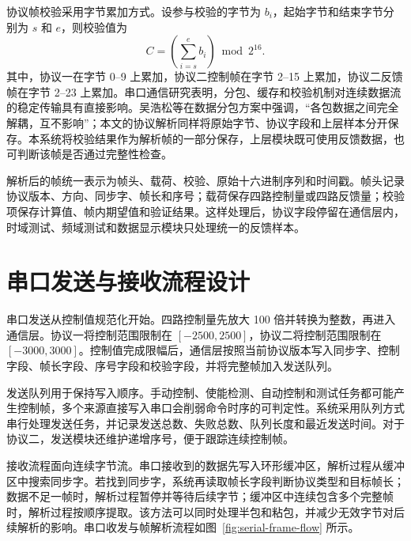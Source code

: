 协议帧校验采用字节累加方式。设参与校验的字节为 $b_i$，起始字节和结束字节分别为 $s$ 和 $e$，则校验值为
\begin{equation}
  C=\left(\sum_{i=s}^{e} b_i\right)\bmod 2^{16}.
\end{equation}
其中，协议一在字节 0--9 上累加，协议二控制帧在字节 2--15 上累加，协议二反馈帧在字节 2--23 上累加。串口通信研究表明，分包、缓存和校验机制对连续数据流的稳定传输具有直接影响。吴浩松等在数据分包方案中强调，``各包数据之间完全解耦，互不影响''\cite{wu2025serialpacket}；本文的协议解析同样将原始字节、协议字段和上层样本分开保存。本系统将校验结果作为解析帧的一部分保存，上层模块既可使用反馈数据，也可判断该帧是否通过完整性检查。

解析后的帧统一表示为帧头、载荷、校验、原始十六进制序列和时间戳。帧头记录协议版本、方向、同步字、帧长和序号；载荷保存四路控制量或四路反馈量；校验项保存计算值、帧内期望值和验证结果。这样处理后，协议字段停留在通信层内，时域测试、频域测试和数据显示模块只处理统一的反馈样本。

\section{串口发送与接收流程设计}

串口发送从控制值规范化开始。四路控制量先放大 100 倍并转换为整数，再进入通信层。协议一将控制范围限制在 $[-2500,2500]$，协议二将控制范围限制在 $[-3000,3000]$。控制值完成限幅后，通信层按照当前协议版本写入同步字、控制字段、帧长字段、序号字段和校验字段，并将完整帧加入发送队列。

发送队列用于保持写入顺序。手动控制、使能检测、自动控制和测试任务都可能产生控制帧，多个来源直接写入串口会削弱命令时序的可判定性。系统采用队列方式串行处理发送任务，并记录发送总数、失败总数、队列长度和最近发送时间。对于协议二，发送模块还维护递增序号，便于跟踪连续控制帧。

接收流程面向连续字节流。串口接收到的数据先写入环形缓冲区，解析过程从缓冲区中搜索同步字。若找到同步字，系统再读取帧长字段判断协议类型和目标帧长；数据不足一帧时，解析过程暂停并等待后续字节；缓冲区中连续包含多个完整帧时，解析过程按顺序提取。该方法可以同时处理半包和粘包，并减少无效字节对后续解析的影响。串口收发与帧解析流程如图~\ref{fig:serial-frame-flow} 所示。

